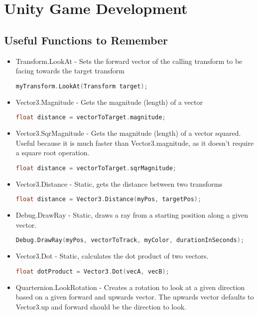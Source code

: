 \documentclass{article}
\begin{document}
\newpage
\section{Unity Game Development}
\subsection{Useful Functions to Remember}
\begin{itemize}
    \item Transform.LookAt - Sets the forward vector of the calling transform to be facing towards the target transform
    \begin{lstlisting}[language=C++]
                myTransform.LookAt(Transform target); \end{lstlisting} 
    \item Vector3.Magnitude - Gets the magnitude (length) of a vector
    \begin{lstlisting}[language=C++]
                float distance = vectorToTarget.magnitude; \end{lstlisting}
    \item Vector3.SqrMagnitude - Gets the magnitude (length) of a vector squared. Useful because it is much faster than Vector3.magnitude, as it doesn't require a square root operation.
    \begin{lstlisting}[language=C++]
                float distance = vectorToTarget.sqrMagnitude; \end{lstlisting}
    \item Vector3.Distance - Static, gets the distance between two transforms
    \begin{lstlisting}[language=C++]
                float distance = Vector3.Distance(myPos, targetPos); \end{lstlisting}
    \item Debug.DrawRay - Static, draws a ray from a starting position along a given vector.
    \begin{lstlisting}[language=C++]
                Debug.DrawRay(myPos, vectorToTrack, myColor, durationInSeconds); \end{lstlisting}
    \item Vector3.Dot - Static, calculates the dot product of two vectors.
    \begin{lstlisting}[language=C++]
                float dotProduct = Vector3.Dot(vecA, vecB); \end{lstlisting}
    \item Quarternion.LookRotation - Creates a rotation to look at a given direction based on a given forward and upwards vector. The upwards vector defaults to Vector3.up and forward should be the direction to look.

\end{itemize}
\end{document}
